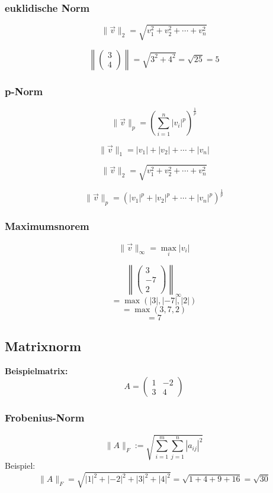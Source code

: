 \documentclass[9pt,a4paper]{article}
\begin{document}
    \subsubsection{euklidische Norm}
    $$\| \vec{v} \|_2  = \sqrt{v_1^2 + v_2^2 + \cdots + v_n^2}$$
    
    $$\left\| \begin{pmatrix} 3 \\ 4 \end{pmatrix} \right\| = \sqrt{3^2 + 4^2} = \sqrt{25} = 5$$
    
    \subsubsection{p-Norm}
    
    $$\|\vec{v}\|_p = \left( \sum_{i=1}^{n} |v_i|^p \right)^{\frac{1}{p}}$$
    
    $$\|\vec{v}\|_1 = |v_1| + |v_2| + \cdots + |v_n|$$
    
    $$\|\vec{v}\|_2 = \sqrt{v_1^2 + v_2^2 + \cdots + v_n^2}$$
    
    $$\|\vec{v}\|_p = \left( |v_1|^p + |v_2|^p + \cdots + |v_n|^p \right)^{\frac{1}{p}}$$
    
    \subsubsection{Maximumsnorem}
    
    $$\|\vec{v}\|_\infty = \max_{i} |v_i|$$
    
    $$\left\| \begin{pmatrix} 3 \\ -7 \\ 2 \end{pmatrix} \right\|_\infty$$
    $$= \max(|3|, |-7|, |2|) $$
    $$= \max(3, 7, 2) $$
    $$= 7$$
    
    \subsection{Matrixnorm}
    
    \textbf{Beispielmatrix:}
    $$A = \begin{pmatrix} 1 & -2 \\ 3 & 4 \end{pmatrix}$$
    
    \subsubsection{Frobenius-Norm}
    $$\|A\|_F := \sqrt{\sum_{i=1}^{m} \sum_{j=1}^{n} |a_{ij}|^2}$$
    Beispiel:
    $$\|A\|_F = \sqrt{|1|^2 + |-2|^2 + |3|^2 + |4|^2} 
    = \sqrt{1 + 4 + 9 + 16} 
    = \sqrt{30}$$
    
\end{document}
